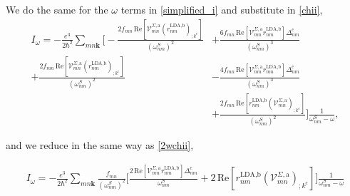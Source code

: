 \documentclass[10pt]{article}
\begin{document}
We do the same for the $\omega$ terms in \eqref{simplified_i} and substitute in \eqref{chii},
\begin{align}\label{wchii}
I_{\omega}
= -\frac{e^3}{2\hbar^2}\sum_{mn\mathbf{k}}
\Biggl[
 - \frac{2f_{mn}\,\mathrm{Re}\left[\mathcal{V}^{\Sigma,\text{a}}_{mn}\left(r^{\text{LDA,b}}_{nm}\right)_{;k^{\text{c}}}\right]}{(\omega^{S}_{nm})^{2}}
&+ \frac{6f_{mn}\,\mathrm{Re}\left[\mathcal{V}^{\Sigma,\text{a}}_{mn}r^{\text{LDA,b}}_{nm}\right]\Delta^{\text{c}}_{nm}}{(\omega^{S}_{nm})^{3}}\nonumber\\
 + \frac{2f_{mn}\,\mathrm{Re}\left[\mathcal{V}^{\Sigma,\text{a}}_{mn}\left(r^{\text{LDA,b}}_{nm}\right)_{;k^{\text{c}}}\right]}{(\omega^{S}_{nm})^{2}}
&- \frac{4f_{mn}\,\mathrm{Re}\left[\mathcal{V}^{\Sigma,\text{a}}_{nm}r^{\text{LDA,b}}_{mn}\right]\Delta_{nm}^{\text{c}}}{(\omega^{S}_{nm})^{3}}\nonumber\\
&+ \frac{2f_{mn}\,\mathrm{Re}\left[r^{\text{LDA,b}}_{nm}\left(\mathcal{V}^{\Sigma,\text{a}}_{mn}\right)_{;k^{\text{c}}}\right]}{(\omega^{S}_{nm})^{2}}
\Biggr]\frac{1}{\omega^{S}_{nm}-\omega},
\end{align}

and we reduce in the same way as \eqref{2wchii},

\begin{align}\label{wchii_simplified}
I_{\omega}
= -\frac{e^3}{2\hbar^2}\sum_{mn\mathbf{k}}\frac{f_{mn}}{(\omega^{S}_{nm})^{2}}
\Biggl[
 \frac{2\,\mathrm{Re}\left[\mathcal{V}^{\Sigma,\text{a}}_{mn}r^{\text{LDA,b}}_{nm}\right]\Delta^{\text{c}}_{nm}}{\omega^{S}_{nm}} 
+ 2\,\mathrm{Re}\left[r^{\text{LDA,b}}_{nm}\left(\mathcal{V}^{\Sigma,\text{a}}_{mn}\right)_{;k^{\text{c}}}\right]
\Biggr]\frac{1}{\omega^{S}_{nm}-\omega}\nonumber\\
\end{align}
\end{document}
